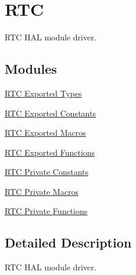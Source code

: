 \hypertarget{group___r_t_c}{}\section{R\+TC}
\label{group___r_t_c}


R\+TC H\+AL module driver.  


\subsection*{Modules}
\begin{DoxyCompactItemize}
\item 
\hyperlink{group___r_t_c___exported___types}{R\+T\+C Exported Types}
\item 
\hyperlink{group___r_t_c___exported___constants}{R\+T\+C Exported Constants}
\item 
\hyperlink{group___r_t_c___exported___macros}{R\+T\+C Exported Macros}
\item 
\hyperlink{group___r_t_c___exported___functions}{R\+T\+C Exported Functions}
\item 
\hyperlink{group___r_t_c___private___constants}{R\+T\+C Private Constants}
\item 
\hyperlink{group___r_t_c___private___macros}{R\+T\+C Private Macros}
\item 
\hyperlink{group___r_t_c___private___functions}{R\+T\+C Private Functions}
\end{DoxyCompactItemize}


\subsection{Detailed Description}
R\+TC H\+AL module driver. 

